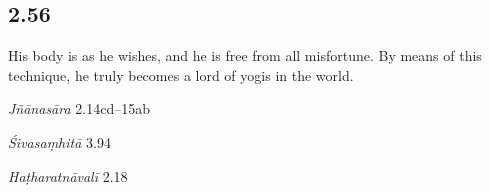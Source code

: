 \begin{ekdosis}

\subsection*{2.56}
\begin{translation}[hp02_056]
His body is as he wishes, and he is free from all misfortune. By means of this technique, he truly becomes a lord of yogis in the world.
\end{translation}

\begin{sources}[hp02_056]
\emph{Jñānasāra} 2.14cd–15ab

\begin{versinnote}
\end{versinnote}

\emph{Śivasaṃhitā} 3.94
\begin{versinnote}
\end{versinnote}
\end{sources}

\begin{testimonia}[hp02_056]
\emph{Haṭharatnāvalī} 2.18 

\begin{versinnote}
\tl{°dehas tu ] °dehaḥ syāt P; °dehasyāt T,t1\\!}
\end{versinnote}


\end{testimonia}
\end{ekdosis}
